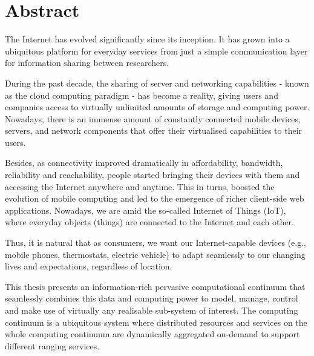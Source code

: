 \cleardoublepage
{}
{}
\begingroup

\chapter*{Abstract}

The Internet has evolved significantly since its inception. It has grown into a ubiquitous platform for everyday services from just a simple communication layer for information sharing between researchers. 

During the past decade, the sharing of server and networking capabilities - known as the cloud computing paradigm - has become a reality, giving users and companies access to virtually unlimited amounts of storage and computing power. Nowadays, there is an immense amount of constantly connected mobile devices, servers, and network components that offer their virtualised capabilities to their users.

Besides, as connectivity improved dramatically in affordability, bandwidth, reliability and reachability, people started bringing their devices with them and accessing the Internet anywhere and anytime. This in turns, boosted the evolution of mobile computing and led to the emergence of richer client-side web applications.  Nowadays, we are amid the so-called Internet of Things (IoT), where everyday objects (things) are connected to the Internet and each other. 

Thus, it is natural that as consumers, we want our Internet-capable devices (e.g., mobile phones, thermostats, electric vehicle) to adapt seamlessly to our changing lives and expectations, regardless of location.

This thesis presents an information-rich pervasive computational continuum that seamlessly combines this data and computing power to model, manage, control and make use of virtually any realisable sub-system of interest.  The computing continuum is a ubiquitous system where distributed resources and services on the whole computing continuum are dynamically aggregated on-demand to support different ranging services.


%
%

\endgroup			

\vfill

